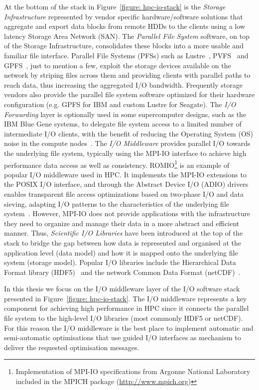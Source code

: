 At the bottom of the stack in Figure~\ref{figure: hpc-io-stack} is the \textit{Storage Infrastructure} represented by vendor specific hardware/software solutions that aggregate and export data blocks from remote HDDs to the clients using a low latency Storage Area Network (SAN). The \textit{Parallel File System} software, on top of the Storage Infrastructure, consolidates these blocks into a more usable and familiar file interface. Parallel File Systems (PFSs) such as Lustre~\cite{Braam02}, PVFS~\cite{CarnsLRT} and GPFS~\cite{SchmuckH02}, just to mention a few, exploit the storage devices available on the network by striping files across them and providing clients with parallel paths to reach data, thus increasing the aggregated I/O bandwidth. Frequently storage vendors also provide the parallel file system software optimized for their hardware configuration (e.g. GPFS for IBM and custom Lustre for Seagate). The \textit{I/O Forwarding} layer is optionally used in some supercomputer designs, such as the IBM Blue Gene systems, to delegate file system access to a limited number of intermediate I/O clients, with the benefit of reducing the Operating System (OS) noise in the compute nodes~\cite{AliCIKLLRWS09}. The \textit{I/O Middleware} provides parallel I/O towards the underlying file system, typically using the MPI-IO interface to achieve high performance data access as well as consistency. ROMIO\footnote{Implementation of MPI-IO specifications from Argonne National Laboratory included in the MPICH package (\url{http://www.mpich.org})} is an example of popular I/O middleware used in HPC. It implements the MPI-IO extensions to the POSIX I/O interface, and through the Abstract Device I/O  (ADIO) drivers~\cite{ThakurGL96} enables transparent file access optimizations based on two-phase I/O and data sieving, adapting I/O patterns to the characteristics of the underlying file system~\cite{ThakurGL99}. However, MPI-IO does not provide applications with the infrastructure they need to organize and manage their data in a more abstract and efficient manner. Thus, \textit{Scientific I/O Libraries} have been introduced at the top of the stack to bridge the gap between how data is represented and organised at the application level (data model) and how it is mapped onto the underlying file system (storage model). Popular I/O libraries include the Hierarchical Data Format library (HDF5)~\cite{hdf5} and the network Common Data Format (netCDF)~\cite{netcdf}.

In this thesis we focus on the I/O middleware layer of the I/O software stack presented in Figure~\ref{figure: hpc-io-stack}. The I/O middleware represents a key component for achieving high performance in HPC since it connects the parallel file system to the high-level I/O libraries (most commonly HDF5 or netCDF). For this reason the I/O middleware is the best place to implement automatic and semi-automatic optimisations that use guided I/O interfaces as mechanism to deliver the requested optimisation messages.

